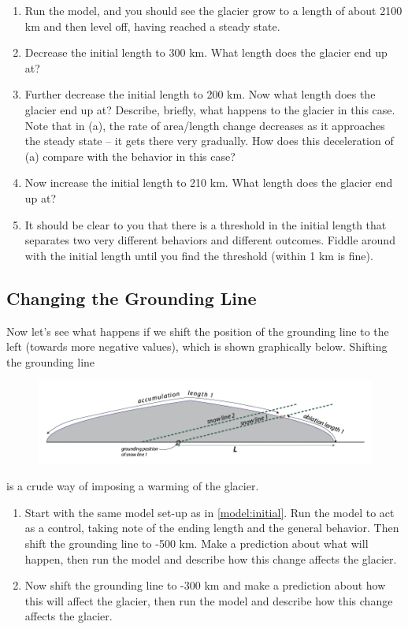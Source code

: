 \documentclass[11pt,letterpaper]{article}
\begin{document}
\begin{enumerate}[label=(\alph*)]
\item Run the model, and you should see the glacier grow to a length of about 2100 km and then level off, having reached a steady state.  

\item Decrease the initial length to 300 km.  What length does the glacier end up at?

\item Further decrease the initial length to 200 km. Now what length does the glacier end up at?  Describe, briefly, what happens to the glacier in this case.  Note that in (a), the rate of area/length change decreases as it approaches the steady state -- it gets there very gradually.  How does this deceleration of (a) compare with the behavior in this case?

\item Now increase the initial length to 210 km. What length does the glacier end up at? 

\item It should be clear to you that there is a threshold in the initial length that separates two very different behaviors and different outcomes.  Fiddle around with the initial length until you find the threshold (within 1 km is fine).
\end{enumerate}

\subsection{Changing the Grounding Line}

Now let’s see what happens if we shift the position of the grounding line to the left (towards more negative values), which is shown graphically below. Shifting the grounding line 
\begin{figure}[t]
\includegraphics[width=\textwidth]{./grounding_line.png}
\end{figure}
is a crude way of imposing a warming of the glacier. 

\begin{enumerate}[label=(\alph*)]
\item Start with the same model set-up as in \ref{model:initial}. Run the model to act as a control, taking note of the ending length and the general behavior. Then shift the grounding line to -500 km.  Make a prediction about what will happen, then run the model and describe how this change affects the glacier.

\item Now shift the grounding line to -300 km and make a prediction about how this will affect the glacier, then run the model and describe how this change affects the glacier.
\end{enumerate}
\end{document}
